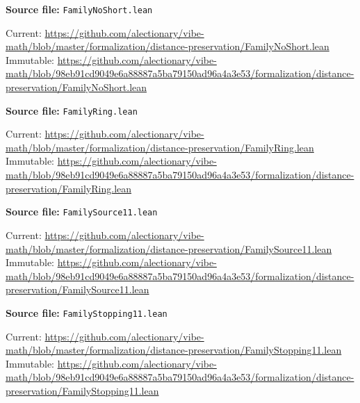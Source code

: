 \par\smallskip\noindent\begin{minipage}{\linewidth}\small\setlength{\baselineskip}{11pt}
\textbf{Source file:} \nolinkurl{FamilyNoShort.lean}\par\nopagebreak
Current: \url{https://github.com/alectionary/vibe-math/blob/master/formalization/distance-preservation/FamilyNoShort.lean}\\
Immutable: \url{https://github.com/alectionary/vibe-math/blob/98eb91cd9049e6a88887a5ba79150ad96a4a3e53/formalization/distance-preservation/FamilyNoShort.lean}\par\end{minipage}\par
\par\smallskip\noindent\begin{minipage}{\linewidth}\small\setlength{\baselineskip}{11pt}
\textbf{Source file:} \nolinkurl{FamilyRing.lean}\par\nopagebreak
Current: \url{https://github.com/alectionary/vibe-math/blob/master/formalization/distance-preservation/FamilyRing.lean}\\
Immutable: \url{https://github.com/alectionary/vibe-math/blob/98eb91cd9049e6a88887a5ba79150ad96a4a3e53/formalization/distance-preservation/FamilyRing.lean}\par\end{minipage}\par
\par\smallskip\noindent\begin{minipage}{\linewidth}\small\setlength{\baselineskip}{11pt}
\textbf{Source file:} \nolinkurl{FamilySource11.lean}\par\nopagebreak
Current: \url{https://github.com/alectionary/vibe-math/blob/master/formalization/distance-preservation/FamilySource11.lean}\\
Immutable: \url{https://github.com/alectionary/vibe-math/blob/98eb91cd9049e6a88887a5ba79150ad96a4a3e53/formalization/distance-preservation/FamilySource11.lean}\par\end{minipage}\par
\par\smallskip\noindent\begin{minipage}{\linewidth}\small\setlength{\baselineskip}{11pt}
\textbf{Source file:} \nolinkurl{FamilyStopping11.lean}\par\nopagebreak
Current: \url{https://github.com/alectionary/vibe-math/blob/master/formalization/distance-preservation/FamilyStopping11.lean}\\
Immutable: \url{https://github.com/alectionary/vibe-math/blob/98eb91cd9049e6a88887a5ba79150ad96a4a3e53/formalization/distance-preservation/FamilyStopping11.lean}\par\end{minipage}\par
